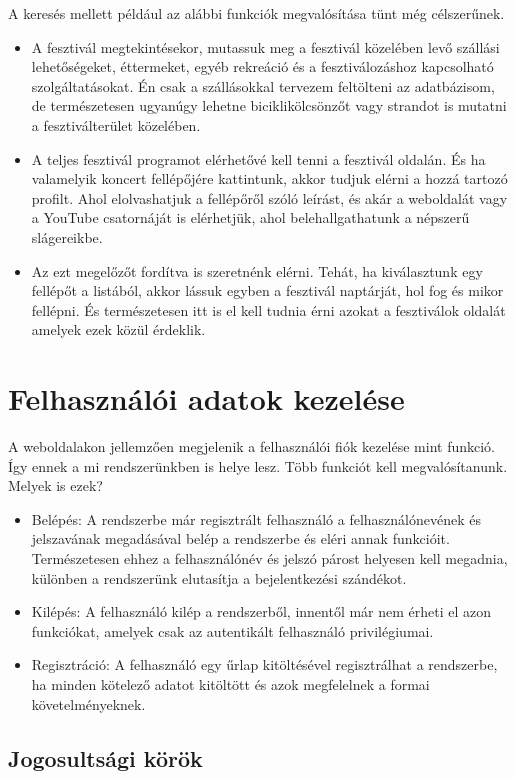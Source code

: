 A keresés mellett például az alábbi funkciók megvalósítása tünt még célszerűnek.
\begin{itemize}
\item A fesztivál megtekintésekor, mutassuk meg a fesztivál közelében levő szállási lehetőségeket, éttermeket, egyéb rekreáció és a fesztiválozáshoz kapcsolható szolgáltatásokat. Én csak a szállásokkal tervezem feltölteni az adatbázisom, de természetesen ugyanúgy lehetne biciklikölcsönzőt vagy strandot is mutatni a fesztiválterület közelében.
\item A teljes fesztivál programot elérhetővé kell tenni a fesztivál oldalán. És ha valamelyik koncert fellépőjére kattintunk, akkor tudjuk elérni a hozzá tartozó profilt. Ahol elolvashatjuk a fellépőről szóló leírást, és akár a weboldalát vagy a YouTube csatornáját is elérhetjük, ahol belehallgathatunk a népszerű slágereikbe.
\item Az ezt megelőzőt fordítva is szeretnénk elérni. Tehát, ha kiválasztunk egy fellépőt a listából, akkor lássuk egyben a fesztivál naptárját, hol fog és mikor fellépni. És természetesen itt is el kell tudnia érni azokat a fesztiválok oldalát amelyek ezek közül érdeklik.
\end{itemize}

\section{Felhasználói adatok kezelése}

A weboldalakon jellemzően megjelenik a felhasználói fiók kezelése mint funkció. Így ennek a mi rendszerünkben is helye lesz.
Több funkciót kell megvalósítanunk. Melyek is ezek?
\begin{itemize}
\item Belépés: A rendszerbe már regisztrált felhasználó a felhasználónevének és jelszavának megadásával belép a rendszerbe és eléri annak funkcióit. Természetesen ehhez a felhasználónév és jelszó párost helyesen kell megadnia, különben a rendszerünk elutasítja a bejelentkezési szándékot.
\item Kilépés: A felhasználó kilép a rendszerből, innentől már nem érheti el azon funkciókat, amelyek csak az autentikált felhasználó privilégiumai.
\item Regisztráció: A felhasználó egy űrlap kitöltésével regisztrálhat a rendszerbe, ha minden kötelező adatot kitöltött és azok megfelelnek a formai követelményeknek.
\end{itemize}

\subsection{Jogosultsági körök}

